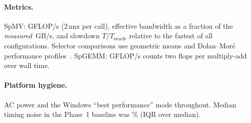 \paragraph{Metrics.} SpMV: GFLOP/s ($2\,\mathrm{nnz}$ per call), effective bandwidth as a fraction of the
\emph{measured} \,GB/s, and slowdown $T/T_\text{oracle}$ relative to the fastest of all
configurations. Selector comparisons use geometric means and Dolan--Mor\'e performance
profiles~\cite{dolan2002profiles}. SpGEMM: GFLOP/s counts two flops per multiply-add over wall time.

\paragraph{Platform hygiene.} AC power and the Windows ``best performance'' mode throughout. Median timing noise in
the Phase~1 baseline was \% (IQR over median).
